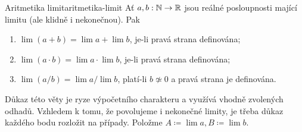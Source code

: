 \begin{theorem}{Aritmetika limit}{aritmetika-limit}
 Ať $a,b:\mathbb{N} \to \mathbb{R}$ jsou reálné posloupnosti mající limitu (ale klidně i
 nekonečnou). Pak
 \begin{enumerate}[label=(\alph*)]
  \item $\lim (a + b) = \lim a + \lim b$, je-li pravá strana definována;
  \item $\lim (a \cdot b) = \lim a \cdot \lim b$, je-li pravá strana definována;
  \item $\lim (a / b) = \lim a / \lim b$, platí-li $b \not\simeq 0$ a pravá
   strana je definována.
 \end{enumerate}
\end{theorem}
\begin{thmproof}
 Důkaz této věty je ryze výpočetního charakteru a využívá vhodně zvolených
 odhadů. Vzhledem k tomu, že povolujeme i nekonečné limity, je třeba důkaz
 každého bodu rozložit na případy. Položme $A \coloneqq \lim a, B \coloneqq \lim
 b$.


\end{thmproof}
